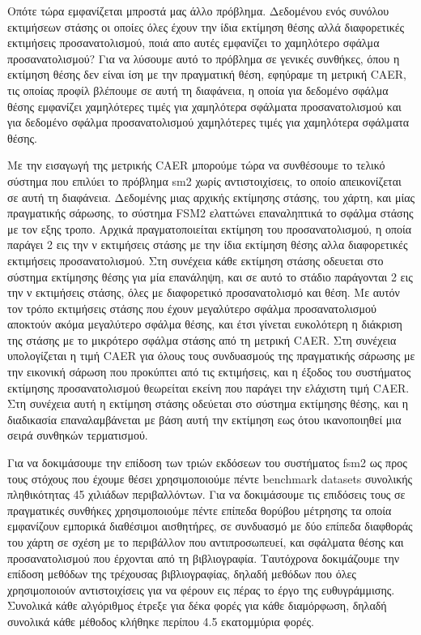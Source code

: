 \documentclass[a4paper,10pt]{article}
\begin{document}
Οπότε τώρα εμφανίζεται μπροστά μας άλλο πρόβλημα. Δεδομένου ενός συνόλου
εκτιμήσεων στάσης οι οποίες όλες έχουν την ίδια εκτίμηση θέσης αλλά
διαφορετικές εκτιμήσεις προσανατολισμού, ποιά απο αυτές εμφανίζει το χαμηλότερο
σφάλμα προσανατολισμού? Για να λύσουμε αυτό το πρόβλημα σε γενικές συνθήκες,
όπου η εκτίμηση θέσης δεν είναι ίση με την πραγματική θέση, εφηύραμε τη μετρική
CAER, τις οποίας προφίλ βλέπουμε σε αυτή τη διαφάνεια, η οποία για δεδομένο
σφάλμα θέσης εμφανίζει χαμηλότερες τιμές για χαμηλότερα σφάλματα
προσανατολισμού και για δεδομένο σφάλμα προσανατολισμού χαμηλότερες τιμές για
χαμηλότερα σφάλματα θέσης.



Με την εισαγωγή της μετρικής CAER μπορούμε τώρα να συνθέσουμε το τελικό σύστημα
που επιλύει το πρόβλημα sm2 χωρίς αντιστοιχίσεις, το οποίο απεικονίζεται σε
αυτή τη διαφάνεια. Δεδομένης μιας αρχικής εκτίμησης στάσης, του χάρτη, και μίας
πραγματικής σάρωσης, το σύστημα FSM2 ελαττώνει επαναληπτικά το σφάλμα στάσης με
τον εξης τροπο.  Αρχικά πραγματοποιείται εκτίμηση του προσανατολισμού, η οποία
παράγει 2 εις την ν εκτιμήσεις στάσης με την ίδια εκτίμηση θέσης αλλα
διαφορετικές εκτιμήσεις προσανατολισμού.  Στη συνέχεια κάθε εκτίμηση στάσης
οδευεται στο σύστημα εκτίμησης θέσης για μία επανάληψη, και σε αυτό το στάδιο
παράγονται 2 εις την ν εκτιμήσεις στάσης, όλες με διαφορετικό προσανατολισμό
και θέση. Με αυτόν τον τρόπο εκτιμήσεις στάσης που έχουν μεγαλύτερο σφάλμα
προσανατολισμού αποκτούν ακόμα μεγαλύτερο σφάλμα θέσης, και έτσι γίνεται
ευκολότερη η διάκριση της στάσης με το μικρότερο σφάλμα στάσης από τη μετρική
CAER.  Στη συνέχεια υπολογίζεται η τιμή CAER για όλους τους συνδυασμούς της
πραγματικής σάρωσης με την εικονική σάρωση που προκύπτει από τις εκτιμήσεις,
και η έξοδος του συστήματος εκτίμησης προσανατολισμού θεωρείται εκείνη που
παράγει την ελάχιστη τιμή CAER. Στη συνέχεια αυτή η εκτίμηση στάσης οδεύεται
στο σύστημα εκτίμησης θέσης, και η διαδικασία επαναλαμβάνεται με βάση αυτή την
εκτίμηση εως ότου ικανοποιηθεί μια σειρά συνθηκών τερματισμού.


Για να δοκιμάσουμε την επίδοση των τριών εκδόσεων του συστήματος fsm2 ως προς
τους στόχους που έχουμε θέσει χρησιμοποιούμε πέντε benchmark datasets συνολικής
πληθικότητας 45 χιλιάδων περιβαλλόντων. Για να δοκιμάσουμε τις επιδόσεις τους
σε πραγματικές συνθήκες χρησιμοποιούμε πέντε επίπεδα θορύβου μέτρησης τα οποία
εμφανίζουν εμπορικά διαθέσιμοι αισθητήρες, σε συνδυασμό με δύο επίπεδα
διαφθοράς του χάρτη σε σχέση με το περιβάλλον που αντιπροσωπευεί, και σφάλματα
θέσης και προσανατολισμού που έρχονται από τη βιβλιογραφία. Ταυτόχρονα
δοκιμάζουμε την επίδοση μεθόδων της τρέχουσας βιβλιογραφίας, δηλαδή μεθόδων που
όλες χρησιμοποιούν αντιστοιχίσεις για να φέρουν εις πέρας το έργο της
ευθυγράμμισης. Συνολικά κάθε αλγόριθμος έτρεξε για δέκα φορές για κάθε
διαμόρφωση, δηλαδή συνολικά κάθε μέθοδος κλήθηκε περίπου 4.5 εκατομμύρια φορές.
\end{document}
